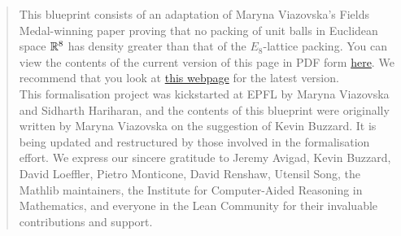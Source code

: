 
%


\begin{abstract}
  This blueprint consists of an adaptation of Maryna Viazovska's Fields Medal-winning paper proving that no packing of unit balls in Euclidean space $\R^8$ has density greater than that of the $E_8$-lattice packing.
  \ifplastex
  You can view the contents of the current version of this page in PDF form \href{https://thefundamentaltheor3m.github.io/Sphere-Packing-Lean/blueprint.pdf}{here}.
  \else
  We recommend that you look at \href{https://thefundamentaltheor3m.github.io/Sphere-Packing-Lean/blueprint/index.html}{this webpage} for the latest version.
  \fi \\

  This formalisation project was kickstarted at EPFL by Maryna Viazovska and Sidharth Hariharan, and the contents of this blueprint were originally written by Maryna Viazovska on the suggestion of Kevin Buzzard. It is being updated and restructured by those involved in the formalisation effort. We express our sincere gratitude to Jeremy Avigad, Kevin Buzzard, David Loeffler, Pietro Monticone, David Renshaw, Utensil Song, the Mathlib maintainers, the Institute for Computer-Aided Reasoning in Mathematics, and everyone in the Lean Community for their invaluable contributions and support.
  \end{abstract}

\tableofcontents

